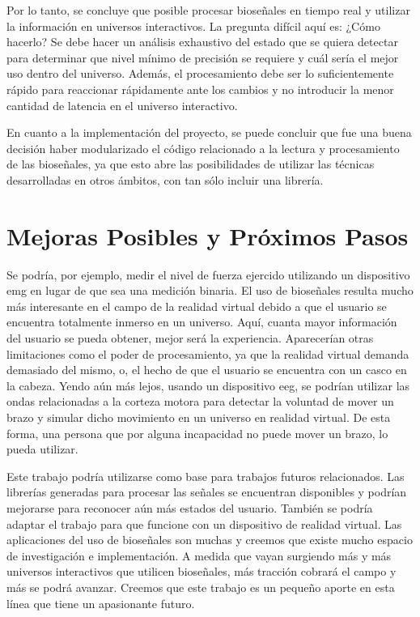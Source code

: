 Por lo tanto, se concluye que posible procesar bioseñales en tiempo real y utilizar la información en universos interactivos. La pregunta difícil aquí es: ¿Cómo hacerlo? Se debe hacer un análisis exhaustivo del estado que se quiera detectar para determinar que nivel mínimo de precisión se requiere y cuál sería el mejor uso dentro del universo. Además, el procesamiento debe ser lo suficientemente rápido para reaccionar rápidamente ante los cambios y no introducir la menor cantidad de latencia en el universo interactivo.

En cuanto a la implementación del proyecto, se puede concluir que fue una buena decisión haber modularizado el código relacionado a la lectura y procesamiento de las bioseñales, ya que esto abre las posibilidades de utilizar las técnicas desarrolladas en otros ámbitos, con tan sólo incluir una librería.

\section{Mejoras Posibles y Próximos Pasos}

Se podría, por ejemplo, medir el nivel de fuerza ejercido utilizando un dispositivo \acrshort{emg} en lugar de que sea una medición binaria. El uso de bioseñales resulta mucho más interesante en el campo de la realidad virtual debido a que el usuario se encuentra totalmente inmerso en un universo. Aquí, cuanta mayor información del usuario se pueda obtener, mejor será la experiencia. Aparecerían otras limitaciones como el poder de procesamiento, ya que la realidad virtual demanda demasiado del mismo, o, el hecho de que el usuario se encuentra con un casco en la cabeza. Yendo aún más lejos, usando un dispositivo \acrshort{eeg}, se podrían utilizar las ondas relacionadas a la corteza motora para detectar la voluntad de mover un brazo y simular dicho movimiento en un universo en realidad virtual. De esta forma, una persona que por alguna incapacidad no puede mover un brazo, lo pueda utilizar.

Este trabajo podría utilizarse como base para trabajos futuros relacionados. Las librerías generadas para procesar las señales se encuentran disponibles y podrían mejorarse para reconocer aún más estados del usuario. También se podría adaptar el trabajo para que funcione con un dispositivo de realidad virtual. Las aplicaciones del uso de bioseñales son muchas y creemos que existe mucho espacio de investigación e implementación. A medida que vayan surgiendo más y más universos interactivos que utilicen bioseñales, más tracción cobrará el campo y más se podrá avanzar. Creemos que este trabajo es un pequeño aporte en esta línea que tiene un apasionante futuro.